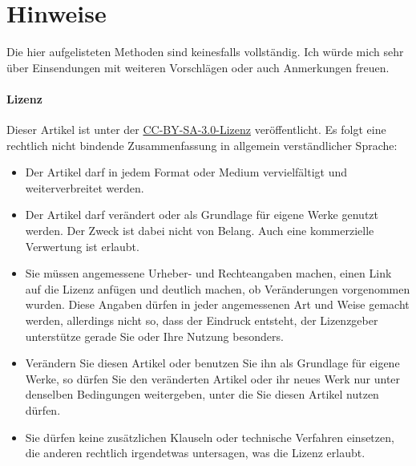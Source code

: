 \section{Hinweise}
Die hier aufgelisteten Methoden sind keinesfalls vollständig. Ich würde mich sehr über Einsendungen mit weiteren Vorschlägen oder auch Anmerkungen freuen.
\paragraph{Lizenz}
Dieser Artikel ist unter der \href{http://creativecommons.org/licenses/by-sa/3.0/de/}{CC-BY-SA-3.0-Lizenz} veröffentlicht. Es folgt eine rechtlich nicht bindende Zusammenfassung in allgemein verständlicher Sprache:
\begin{itemize}
	\item Der Artikel darf in jedem Format oder Medium vervielfältigt und weiterverbreitet werden.
	\item Der Artikel darf verändert oder als Grundlage für eigene Werke genutzt werden. Der Zweck ist dabei nicht von Belang. Auch eine kommerzielle Verwertung ist erlaubt.
	\item Sie müssen angemessene Urheber- und Rechteangaben machen, einen Link auf die Lizenz anfügen und deutlich machen, ob Veränderungen vorgenommen wurden. Diese Angaben dürfen in jeder angemessenen Art und Weise gemacht werden, allerdings nicht so, dass der Eindruck entsteht, der Lizenzgeber unterstütze gerade Sie oder Ihre Nutzung besonders.
	\item Verändern Sie diesen Artikel oder benutzen Sie ihn als Grundlage für eigene Werke, so dürfen Sie den veränderten Artikel oder ihr neues Werk nur unter denselben Bedingungen weitergeben, unter die Sie diesen Artikel nutzen dürfen.
	\item Sie dürfen keine zusätzlichen Klauseln oder technische Verfahren einsetzen, die anderen rechtlich irgendetwas untersagen, was die Lizenz erlaubt.
\end{itemize}
